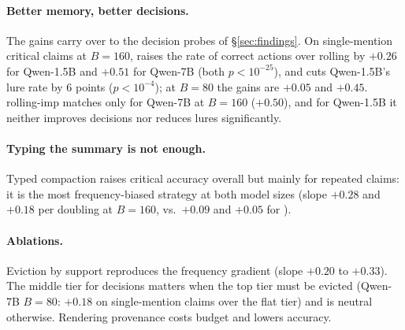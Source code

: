 \paragraph{Better memory, better decisions.}
The gains carry over to the decision probes of \S\ref{sec:findings}.
On single-mention critical claims at $B{=}160$, \ledger{} raises the rate of correct actions over rolling by $+0.26$ for Qwen-1.5B and $+0.51$ for Qwen-7B (both $p<10^{-25}$), and cuts Qwen-1.5B's lure rate by 6 points ($p<10^{-4}$); at $B{=}80$ the gains are $+0.05$ and $+0.45$.
rolling-imp matches \ledger{} only for Qwen-7B at $B{=}160$ ($+0.50$), and for Qwen-1.5B it neither improves decisions nor reduces lures significantly.

\paragraph{Typing the summary is not enough.}
Typed compaction raises critical accuracy overall but mainly for repeated claims: it is the most frequency-biased strategy at both model sizes (slope $+0.28$ and $+0.18$ per doubling at $B{=}160$, vs.\ $+0.09$ and $+0.05$ for \ledger{}).

\paragraph{Ablations.}
Eviction by support reproduces the frequency gradient (slope $+0.20$ to $+0.33$).
The middle tier for decisions matters when the top tier must be evicted (Qwen-7B $B{=}80$: $+0.18$ on single-mention claims over the flat tier) and is neutral otherwise.
Rendering provenance costs budget and lowers accuracy.
